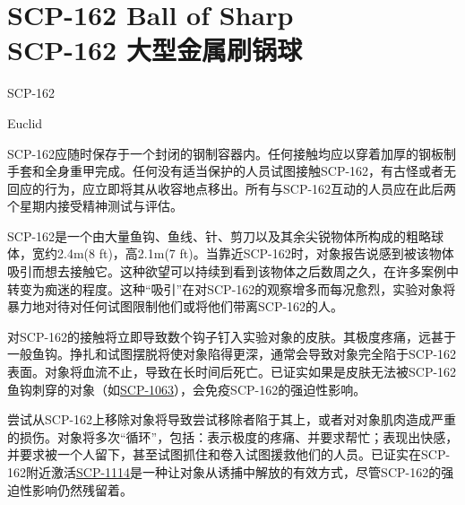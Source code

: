 \chapter[SCP-162 大型金属刷锅球]{
    SCP-162 Ball of Sharp\\
    SCP-162 大型金属刷锅球
}

\label{chap:SCP-162}

SCP-162

Euclid

SCP-162应随时保存于一个封闭的钢制容器内。任何接触均应以穿着加厚的钢板制手套和全身重甲完成。任何没有适当保护的人员试图接触SCP-162，有古怪或者无回应的行为，应立即将其从收容地点移出。所有与SCP-162互动的人员应在此后两个星期内接受精神测试与评估。

SCP-162是一个由大量鱼钩、鱼线、针、剪刀以及其余尖锐物体所构成的粗略球体，宽约2.4m(8 ft)，高2.1m(7 ft)。当靠近SCP-162时，对象报告说感到被该物体吸引而想去接触它。这种欲望可以持续到看到该物体之后数周之久，在许多案例中转变为痴迷的程度。这种“吸引”在对SCP-162的观察增多而每况愈烈，实验对象将暴力地对待对任何试图限制他们或将他们带离SCP-162的人。

对SCP-162的接触将立即导致数个钩子钉入实验对象的皮肤。其极度疼痛，远甚于一般鱼钩。挣扎和试图摆脱将使对象陷得更深，通常会导致对象完全陷于SCP-162表面。对象将血流不止，导致在长时间后死亡。已证实如果是皮肤无法被SCP-162鱼钩刺穿的对象（如\hyperref[chap:SCP-1063]{SCP-1063}），会免疫SCP-162的强迫性影响。

尝试从SCP-162上移除对象将导致尝试移除者陷于其上，或者对对象肌肉造成严重的损伤。对象将多次“循环”，包括：表示极度的疼痛、并要求帮忙；表现出快感，并要求被一个人留下，甚至试图抓住和卷入试图援救他们的人员。已证实在SCP-162附近激活\hyperref[chap:SCP-1114]{SCP-1114}是一种让对象从诱捕中解放的有效方式，尽管SCP-162的强迫性影响仍然残留着。
